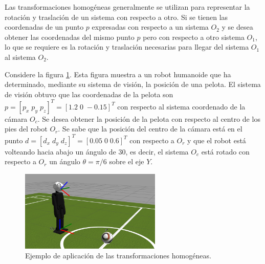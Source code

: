 \documentclass[letterpaper,12pt]{article}
\begin{document}
Las transformaciones homogéneas generalmente se utilizan para representar la rotación y traslación de un sistema con respecto a otro. Si se tienen las coordenadas de un punto $p$ expresadas con respecto a un sistema $O_2$ y se desea obtener las coordenadas del mismo punto $p$ pero con respecto a otro sistema $O_1$, lo que se requiere es la rotación y traslación necesarias para llegar del sistema $O_1$ al sistema $O_2$.

Considere la figura \ref{fig:example}. Esta figura muestra a un robot humanoide que ha determinado, mediante su sistema de visión, la posición de una pelota. El sistema de visión obtuvo que las coordenadas de la pelota son $p = [p_x\;p_y\;p_z]^T = [1.2\;0\;-0.15]^T$ con respecto al sistema coordenado de la cámara $O_c$. Se desea obtener la posición de la pelota con respecto al centro de los pies del robot $O_r$. Se sabe que la posición del centro de la cámara está en el punto $d =[d_x\;d_y\;d_z]^T =[0.05\;0\;0.6]^T$ con respecto a $O_r$ y que el robot está volteando hacia abajo un ángulo de 30\degree, es decir, el sistema $O_c$ está rotado con respecto a $O_r$ un ángulo $\theta=\pi / 6$ sobre el eje $Y$.

\begin{figure}
  \centering
  \includegraphics[width=0.6\textwidth]{example.png}
  \caption{Ejemplo de aplicación de las transformaciones homogéneas.}
  \label{fig:example}
\end{figure}
\end{document}
